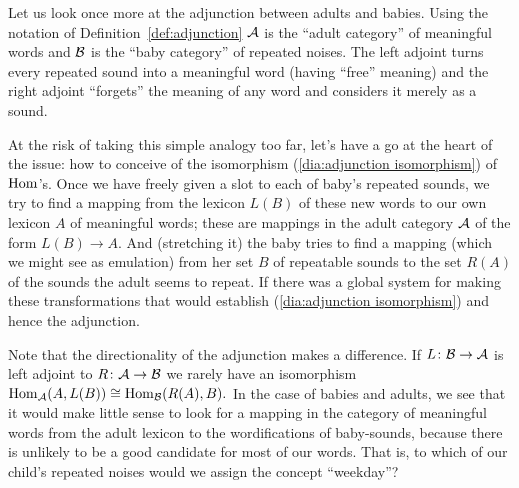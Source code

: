 \documentclass[CT4S-EN-RU]{subfiles}
\begin{document}
\begin{exerciseRUS}\label{ex:monoid adjunction}
\end{exerciseRUS}

\begin{blockENG}
Let us look once more at the adjunction between adults and babies. Using the notation of Definition~\ref{def:adjunction} $\mathcal{A}$ is the “adult category” of meaningful words and $\mathcal{B}$ is the “baby category” of repeated noises. The left adjoint turns every repeated sound into a meaningful word (having “free” meaning) and the right adjoint “forgets” the meaning of any word and considers it merely as a sound. 
\end{blockENG}

\begin{blockRUS}
\end{blockRUS}

\begin{blockENG}
At the risk of taking this simple analogy too far, let's have a go at the heart of the issue: how to conceive of the isomorphism (\ref{dia:adjunction isomorphism}) of $\operatorname{Hom}$'s. Once we have freely given a slot to each of baby's repeated sounds, we try to find a mapping from the lexicon $L(B)$ of these new words to our own lexicon $A$ of meaningful words; these are mappings in the adult category $\mathcal{A}$ of the form $L(B)\to A.$ And (stretching it) the baby tries to find a mapping (which we might see as emulation) from her set $B$ of repeatable sounds to the set $R(A)$ of the sounds the adult seems to repeat. If there was a global system for making these transformations that would establish  (\ref{dia:adjunction isomorphism}) and hence the adjunction.
\end{blockENG}

\begin{blockRUS}
\end{blockRUS}

\begin{blockENG}
Note that the directionality of the adjunction makes a difference. If $L\colon\mathcal{B}\rightarrow\mathcal{A}$ is left adjoint to $R\colon\mathcal{A}\rightarrow\mathcal{B}$ we rarely have an isomorphism $\operatorname{Hom}_\mathcal{A}(A,L(B))\cong\operatorname{Hom}_\mathcal{B}(R(A),B).$ In the case of babies and adults, we see that it would make little sense to look for a mapping in the category of meaningful words from the adult lexicon to the wordifications of baby-sounds, because there is unlikely to be a good candidate for most of our words. That is, to which of our child's repeated noises would we assign the concept “weekday”? 
\end{blockENG}
\end{document}
